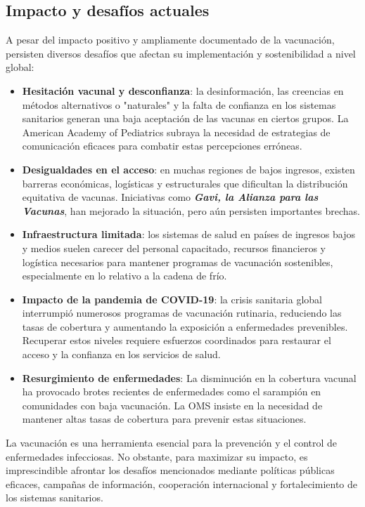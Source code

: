 \subsection{Impacto y desafíos actuales}
A pesar del impacto positivo y ampliamente documentado de la vacunación, persisten diversos desafíos que afectan su implementación y sostenibilidad a nivel global:
\begin{itemize}
    \item \textbf{Hesitación vacunal y desconfianza}: la desinformación, las creencias en métodos alternativos o "naturales" y la falta de confianza en los sistemas sanitarios generan una baja aceptación de las vacunas en ciertos grupos. La American Academy of Pediatrics subraya la necesidad de estrategias de comunicación eficaces para combatir estas percepciones erróneas.
    \item \textbf{Desigualdades en el acceso}: en muchas regiones de bajos ingresos, existen barreras económicas, logísticas y estructurales que dificultan la distribución equitativa de vacunas. Iniciativas como \textbf{\textit{Gavi, la Alianza para las Vacunas}}, han mejorado la situación, pero aún persisten importantes brechas.
    \item \textbf{Infraestructura limitada}: los sistemas de salud en países de ingresos bajos y medios suelen carecer del personal capacitado, recursos financieros y logística necesarios para mantener programas de vacunación sostenibles, especialmente en lo relativo a la cadena de frío.
    \item \textbf{Impacto de la pandemia de COVID-19}: la crisis sanitaria global interrumpió numerosos programas de vacunación rutinaria, reduciendo las tasas de cobertura y aumentando la exposición a enfermedades prevenibles. Recuperar estos niveles requiere esfuerzos coordinados para restaurar el acceso y la confianza en los servicios de salud.
    \item \textbf{Resurgimiento de enfermedades}: La disminución en la cobertura vacunal ha provocado brotes recientes de enfermedades como el sarampión en comunidades con baja vacunación. La OMS insiste en la necesidad de mantener altas tasas de cobertura para prevenir estas situaciones.
\end{itemize}


La vacunación es una herramienta esencial para la prevención y el control de enfermedades infecciosas. No obstante, para maximizar su impacto, es imprescindible afrontar los desafíos mencionados mediante políticas públicas eficaces, campañas de información, cooperación internacional y fortalecimiento de los sistemas sanitarios.

